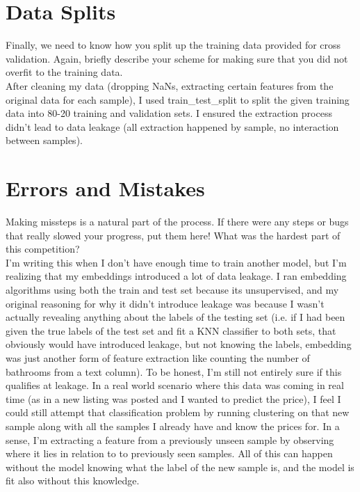 \documentclass[12pt]{article}
\newtheorem{Proof of Lemma}{Proof of Lemma}
\begin{document}
\section{Data Splits}
Finally, we need to know how you split up the training data provided for cross validation. Again, briefly describe your scheme for making sure that you did not overfit to the training data. \\

After cleaning my data (dropping NaNs, extracting certain features from the original data for each sample), I used train\_test\_split to split the given training data into 80-20 training and validation sets. I ensured the extraction process didn't lead to data leakage (all extraction happened by sample, no interaction between samples).

\section{Errors and Mistakes}
Making missteps is a natural part of the process. If there were any steps or bugs that really slowed your progress, put them here! What was the hardest part of this competition? \\

I'm writing this when I don't have enough time to train another model, but I'm realizing that my embeddings introduced a lot of data leakage. I ran embedding algorithms using both the train and test set because its unsupervised, and my original reasoning for why it didn't introduce leakage was because I wasn't actually revealing anything about the labels of the testing set (i.e. if I had been given the true labels of the test set and fit a KNN classifier to both sets, that obviously would have introduced leakage, but not knowing the labels, embedding was just another form of feature extraction like counting the number of bathrooms from a text column). To be honest, I'm still not entirely sure if this qualifies at leakage. In a real world scenario where this data was coming in real time (as in a new listing was posted and I wanted to predict the price), I feel I could still attempt that classification problem by running clustering on that new sample along with all the samples I already have and know the prices for. In a sense, I'm extracting a feature from a previously unseen sample by observing where it lies in relation to to previously seen samples. All of this can happen without the model knowing what the label of the new sample is, and the model is fit also without this knowledge. \\
\end{document}
